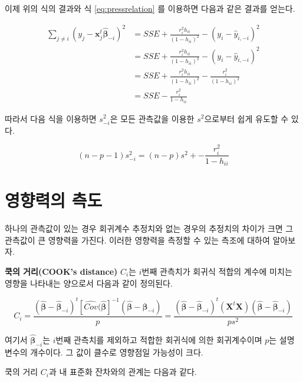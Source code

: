 \documentclass[
]{book}
\theoremstyle{definition}
\theoremstyle{definition}
\theoremstyle{definition}
\theoremstyle{definition}
\theoremstyle{remark}
\begin{document}
이제 위의 식의 결과와 식 \eqref{eq:pressrelation} 를 이용하면 다음과 같은
결과를 얻는다.

\begin{align}
\sum_{j \ne i} (y_j - {\bm x}_j^t \hat{ \bm \beta}_{-i} )^2   
 & =  SSE  + \frac{r^2_i h_{ii}}{(1-h_{ii})^2}   -  (y_i - \hat {y}_{i,-i} )^2 \\
 & = SSE  + \frac{r^2_i h_{ii}}{(1-h_{ii})^2}   -  (y_i - \hat {y}_{i,-i} )^2 \\
  & = SSE  + \frac{r^2_i h_{ii}}{(1-h_{ii})^2}   -   \frac{r^2_i}{(1-h_{ii})^2} \\
  & = SSE  - \frac{r^2_i }{1-h_{ii}}    
\label{eq:sseminusi2}
\end{align}

따라서 다음 식을 이용하면 \(s^2_{-i}\)은 모든 관측값을 이용한
\(s^2\)으로부터 쉽게 유도할 수 있다.

\begin{equation}
(n-p-1) s^2_{-i} = (n-p)s^2 + - \frac{r^2_i }{1-h_{ii}}    
\label{eq:s2relation}
\end{equation}

\hypertarget{uxc601uxd5a5uxb825uxc758-uxce21uxb3c4}{%
\section{영향력의 측도}\label{uxc601uxd5a5uxb825uxc758-uxce21uxb3c4}}

하나의 관측값이 있는 경우 회귀계수 추정치와 없는 경우의 추정치의 차이가
크면 그 관측값이 큰 영향력을 가진다. 이러한 영향력을 측정할 수 있는
측조에 대하여 알아보자.

\textbf{쿡의 거리(COOK's distance)} \(C_i\)는 \(i\)번째 관측치가 회귀식 적합의
계수에 미치는 영향을 나타내는 양으로서 다음과 같이 정의된다.

\begin{equation}
C_i = \frac{  (\hat{ \bm \beta} -\hat{ \bm \beta}_{-i})^t [ \widehat {Cov}(\hat {\bm \beta}]^{-1} 
 (\hat{ \bm \beta} -\hat{ \bm \beta}_{-i}) } {p} = \frac{  (\hat{ \bm \beta} -\hat{ \bm \beta}_{-i})^t (\bm X^t \bm X) (\hat{ \bm \beta} -\hat{ \bm \beta}_{-i}) } {p s^2} 
\label{eq:cookdist}
\end{equation}

여기서 \(\hat{ \bm \beta}_{-i}\)는 \(i\)번째 관측치를 제외하고 적합한
회귀식에 의한 회귀계수이며 \(p\)는 설명변수의 개수이다. 그 값이 클수로
영향점일 가능성이 크다.

쿡의 거리 \(C_i\)과 내 표준화 잔차와의 관계는 다음과 같다.
\end{document}
